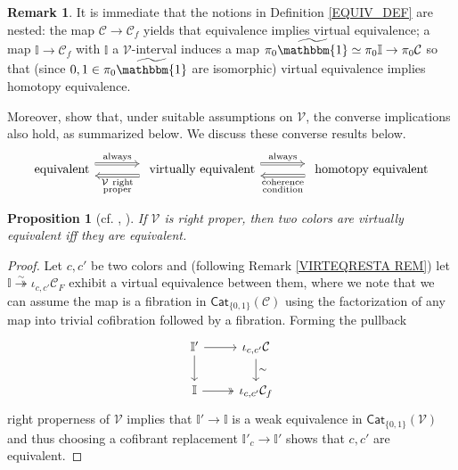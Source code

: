 \documentclass[a4paper,10pt
,draft
]{article}%
\numberwithin{equation}{section}
\numberwithin{figure}{section}
\newtheorem{proposition}[equation]{Proposition}%
\theoremstyle{definition} %
\newtheorem{remark}[equation]{Remark}%
\newcommand{\V}{\ensuremath{\mathcal V}}
\newcommand{\1}{\ensuremath{\mathbbm 1}}%
\begin{document}
\begin{remark}
It is immediate that the notions in Definition \ref{EQUIV_DEF}
are nested: the map $\mathcal{C} \to \mathcal{C}_f$
yields that equivalence implies virtual equivalence;
a map $\mathbb{I} \to \mathcal{C}_f$
with $\mathbb{I}$ a $\mathcal{V}$-interval
induces a map
$\pi_0 \widetilde{\mathbbm{1}} \simeq \pi_0 \mathbb{I} \to \pi_0 \mathcal{C}$ so that (since $0,1 \in \pi_0 \widetilde{\mathbbm{1}}$ are isomorphic)
virtual equivalence implies homotopy equivalence.

Moreover, \cite{BM13,Cav} show that, under suitable assumptions on $\V$, the converse implications also hold, as summarized below.
We discuss these converse results below.
\begin{equation}\label{BASCOMP EQ}
\begin{tikzcd}[column sep = large]
            \mbox{equivalent}
            \arrow[r, Rightarrow, shift left=2, "\mathrm{always}"]
            &
            \mbox{ virtually equivalent}
            \arrow[r, Rightarrow, shift left=2, "\mathrm{always}"]
            \arrow[l, Rightarrow, shift left = 2, "\substack{$\V\phantom{ }$\mathrm{right} \\ \mathrm{proper}}"]
            &
            \mbox{ homotopy equivalent}
            \arrow[l, Rightarrow, shift left = 2, "\substack{\mathrm{coherence} \\ \mathrm{condition}}"]
\end{tikzcd}
\end{equation}
\end{remark}



\begin{proposition}[{cf. \cite[4.12]{Cav}, \cite[2.10]{BM13}}] \label{RIGHTPROPER PROP}
If $\V$ is right proper, then two colors are virtually equivalent iff they are equivalent. 
\end{proposition}

\begin{proof}
Let $c,c'$ be two colors and (following Remark \ref{VIRTEQRESTA REM})
let $\mathbb{I} \overset{\sim}{\twoheadrightarrow} \iota_{c,c'} \mathcal{C}_F$
exhibit a virtual equivalence between them, where we note
that we can assume the map is a fibration in $\mathsf{Cat}_{\{0,1\}}(\mathcal{C})$
using the factorization of any map into trivial cofibration followed by a fibration.
Forming the pullback
\begin{equation}
\begin{tikzcd}
		 \mathbb{I}' \ar{r} \arrow{d}
	&
		\iota_{c,c'} \mathcal{C} \arrow{d}{\sim}
\\
		\mathbb{I} \ar[twoheadrightarrow]{r} 
	&
		\iota_{c,c'}\mathcal{C}_f
\end{tikzcd}
\end{equation}
right properness of $\V$ implies 
that $\mathbb{I}' \to \mathbb{I}$ is a weak equivalence in 
$\mathsf{Cat}_{\{0,1\}}(\V)$
and thus choosing a cofibrant replacement
$\mathbb{I}'_c \to \mathbb{I}'$
shows that $c,c'$ are equivalent.
\end{proof}
\end{document}
